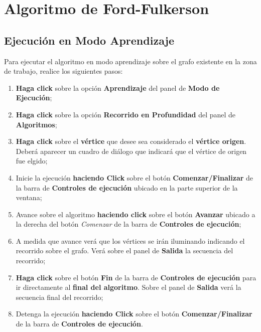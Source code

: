 \documentclass{book}
\begin{document}
%
%
\chapter{Algoritmo de Ford-Fulkerson}


\section{Ejecución en Modo Aprendizaje}

Para ejecutar el algoritmo en modo aprendizaje sobre el grafo existente en la zona de trabajo, realice los siguientes pasos:
\medskip

\begin{enumerate}
	\itemsep=8pt \topsep=0pt \partopsep=0pt \parskip=0pt \parsep=0pt

	\item \textbf{Haga click} sobre la opción \textbf{Aprendizaje} del panel de \textbf{Modo de Ejecución};

	\item \textbf{Haga click} sobre la opción \textbf{Recorrido en Profundidad} del panel de \textbf{Algoritmos};

	\item \textbf{Haga click} sobre el \textbf{vértice} que desee sea considerado el \textbf{vértice origen}. Deberá aparecer un cuadro de diálogo que indicará que el vértice de origen fue elgido;

	\item Inicie la ejecución \textbf{haciendo Click} sobre el botón \textbf{Comenzar/Finalizar} de la barra de \textbf{Controles de ejecución} ubicado en la parte superior de la ventana;

	\item Avance sobre el algoritmo \textbf{haciendo click} sobre el botón \textbf{Avanzar} ubicado a la derecha del botón \textit{Comenzar} de la barra de \textbf{Controles de ejecución};

	\item A medida que avance verá que los vértices se irán iluminando indicando el recorrido sobre el grafo. Verá sobre el panel de \textbf{Salida} la secuencia del recorrido;

	\item \textbf{Haga click} sobre el botón \textbf{Fin} de la barra de \textbf{Controles de ejecución} para ir directamente al \textbf{final del algoritmo}. Sobre el panel de \textbf{Salida} verá la secuencia final del recorrido;

	\item Detenga la ejecución \textbf{haciendo Click} sobre el botón \textbf{Comenzar/Finalizar} de la barra de \textbf{Controles de ejecución}.

\end{enumerate}
\medskip
\end{document}
